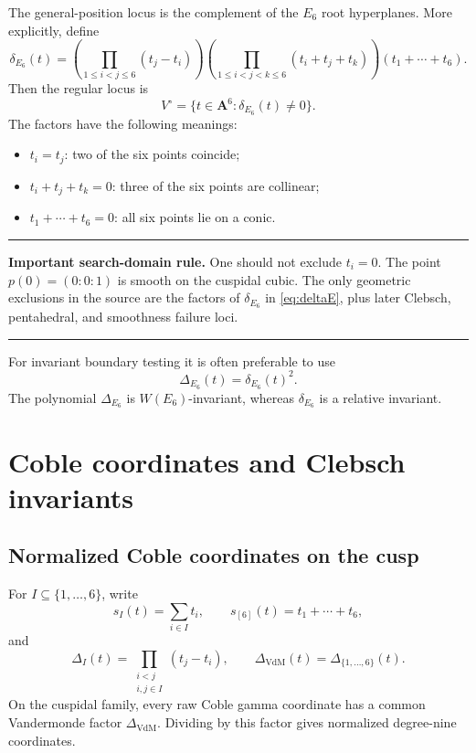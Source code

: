 \documentclass[11pt]{article}
\newcommand{\Aff}{\mathbf{A}}
\newcommand{\Deltav}{\Delta_{\mathrm{VdM}}}
\newcommand{\deltaE}{\delta_{E_6}}
\newcommand{\DeltaE}{\Delta_{E_6}}
\newenvironment{summarybox}{%
  \begin{center}\begin{minipage}{0.94\textwidth}\small
  \hrule\vspace{0.55em}%
}{%
  \vspace{0.55em}\hrule\end{minipage}\end{center}%
}
\begin{document}
The general-position locus is the complement of the $E_6$ root hyperplanes.  More
explicitly, define
\begin{equation}
 \boxed{
  \deltaE(t)=
  \left(\prod_{1\leq i<j\leq6}(t_j-t_i)\right)
  \left(\prod_{1\leq i<j<k\leq6}(t_i+t_j+t_k)\right)
  (t_1+\cdots+t_6).
 }
 \label{eq:deltaE}
\end{equation}
Then the regular locus is
\[
  V^\circ=\{t\in\Aff^6:\deltaE(t)\neq0\}.
\]
The factors have the following meanings:
\begin{itemize}
\item $t_i=t_j$: two of the six points coincide;
\item $t_i+t_j+t_k=0$: three of the six points are collinear;
\item $t_1+\cdots+t_6=0$: all six points lie on a conic.
\end{itemize}

\begin{summarybox}
\textbf{Important search-domain rule.}
One should not exclude $t_i=0$.  The point $p(0)=(0:0:1)$ is smooth on the
cuspidal cubic.  The only geometric exclusions in the source are the factors of
$\deltaE$ in \eqref{eq:deltaE}, plus later Clebsch, pentahedral, and smoothness
failure loci.
\end{summarybox}

For invariant boundary testing it is often preferable to use
\begin{equation}
  \DeltaE(t)=\deltaE(t)^2.
  \label{eq:DeltaE}
\end{equation}
The polynomial $\DeltaE$ is $W(E_6)$-invariant, whereas $\deltaE$ is a relative
invariant.

\section{Coble coordinates and Clebsch invariants}

\subsection{Normalized Coble coordinates on the cusp}

For $I\subseteq\{1,\ldots,6\}$, write
\[
  s_I(t)=\sum_{i\in I}t_i,
  \qquad
  s_{[6]}(t)=t_1+\cdots+t_6,
\]
and
\[
  \Delta_I(t)=\prod_{\substack{i<j\\ i,j\in I}}(t_j-t_i),
  \qquad
  \Deltav(t)=\Delta_{\{1,\ldots,6\}}(t).
\]
On the cuspidal family, every raw Coble gamma coordinate has a common
Vandermonde factor $\Deltav$.  Dividing by this factor gives normalized degree-nine
coordinates.
\end{document}
